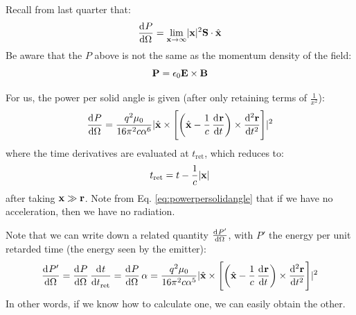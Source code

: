 Recall from last quarter that:
\begin{equation}
    \dod{P}{\Omega} = \lim_{\v{x} \to \infty}\abs{\v{x}}^2\v{S} \cdot \hat{\v{x}}
\end{equation}
Be aware that the $P$ above is not the same as the momentum density of the field:
\begin{equation}
    \mathbf{P} = \epsilon_0 \mathbf{E} \times \mathbf{B}
\end{equation}

For us, the power per solid angle is given (after only retaining terms of $\frac{1}{x^2}$):
\begin{equation}\label{eq:powerpersolidangle}
    \dod{P}{\Omega} = \frac{q^2\mu_0}{16\pi^2c\alpha^6}\abs{\hat{\v{x}}\times\left[\left(\hat{\v{x}} - \frac{1}{c}\dod{\v{r}}{t}\right) \times \dod[2]{\v{r}}{t}\right]}^2
\end{equation}
where the time derivatives are evaluated at $t_{\text{ret}}$, which reduces to:
\begin{equation}
    t_{\text{ret}} = t - \frac{1}{c}\lvert \mathbf{x} \rvert
\end{equation}
after taking $\mathbf{x} \gg \mathbf{r}$. Note from Eq. \eqref{eq:powerpersolidangle} that if we have no acceleration, then we have no radiation.

Note that we can write down a related quantity $\od{P'}{\Omega}$, with $P'$ the energy per unit retarded time (the energy seen by the emitter):
\begin{equation}
    \dod{P'}{\Omega} = \dod{P}{\Omega}\dod{t}{t_{\text{ret}}} = \dod{P}{\Omega} \alpha = \frac{q^2\mu_0}{16\pi^2c\alpha^5}\abs{\hat{\v{x}}\times\left[\left(\hat{\v{x}} - \frac{1}{c}\dod{\v{r}}{t}\right) \times \dod[2]{\v{r}}{t}\right]}^2
\end{equation}
In other words, if we know how to calculate one, we can easily obtain the other.

